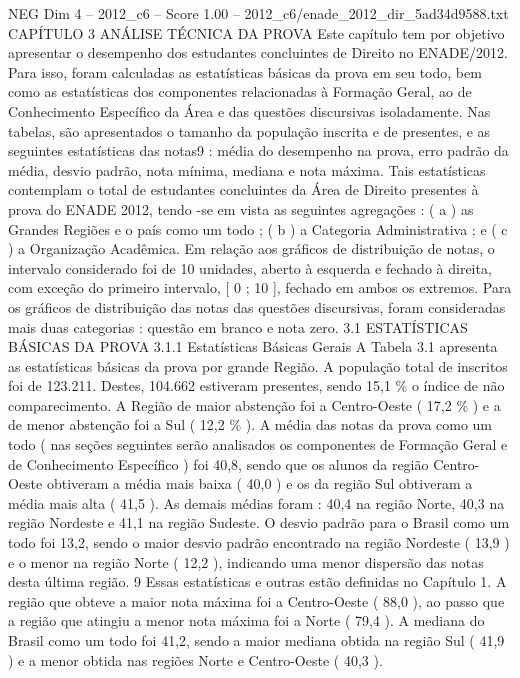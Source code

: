 \begin{textsample}{NEG Dim 4 – 2012\_c6 – Score 1.00 – 2012\_c6/enade\_2012\_dir\_5ad34d9588.txt}  \label{ex:f4_neg_234}
CAPÍTULO 3 ANÁLISE TÉCNICA DA PROVA Este capítulo tem por objetivo apresentar o desempenho dos estudantes concluintes de Direito no ENADE/2012.
Para isso, foram calculadas as estatísticas básicas da prova em seu todo, bem como as estatísticas dos componentes relacionadas à Formação Geral, ao de Conhecimento Específico da Área e das questões discursivas isoladamente.
Nas tabelas, são apresentados o tamanho da população inscrita e de presentes, e as seguintes estatísticas das notas9 : média do desempenho na prova, erro padrão da média, desvio padrão, nota mínima, mediana e nota máxima.
Tais estatísticas contemplam o total de estudantes concluintes da Área de Direito presentes à prova do ENADE 2012, tendo -se em vista as seguintes agregações : ( a ) as Grandes Regiões e o país como um todo ; ( b ) a Categoria Administrativa ; e ( c ) a Organização Acadêmica.
Em relação aos gráficos de distribuição de notas, o intervalo considerado foi de 10 unidades, aberto à esquerda e fechado à direita, com exceção do primeiro intervalo, [ 0 ; 10 ], fechado em ambos os extremos.
Para os gráficos de distribuição das notas das questões discursivas, foram consideradas mais duas categorias : questão em branco e nota zero. 3.1 ESTATÍSTICAS BÁSICAS DA PROVA 3.1.1 Estatísticas Básicas Gerais A Tabela 3.1 apresenta as estatísticas básicas da prova por grande Região.
A população total de inscritos foi de 123.211.
Destes, 104.662 estiveram presentes, sendo 15,1 \% o índice de não comparecimento.
A Região de maior abstenção foi a Centro-Oeste ( 17,2 \% ) e a de menor abstenção foi a Sul ( 12,2 \% ).
A média das notas da prova como um todo ( nas seções seguintes serão analisados os componentes de Formação Geral e de Conhecimento Específico ) foi 40,8, sendo que os alunos da região Centro-Oeste obtiveram a média mais baixa ( 40,0 ) e os da região Sul obtiveram a média mais alta ( 41,5 ).
As demais médias foram : 40,4 na região Norte, 40,3 na região Nordeste e 41,1 na região Sudeste.
O desvio padrão para o Brasil como um todo foi 13,2, sendo o maior desvio padrão encontrado na região Nordeste ( 13,9 ) e o menor na região Norte ( 12,2 ), indicando uma menor dispersão das notas desta última região. 9 Essas estatísticas e outras estão definidas no Capítulo 1.
A região que obteve a maior nota máxima foi a Centro-Oeste ( 88,0 ), ao passo que a região que atingiu a menor nota máxima foi a Norte ( 79,4 ).
A mediana do Brasil como um todo foi 41,2, sendo a maior mediana obtida na região Sul ( 41,9 ) e a menor obtida nas regiões Norte e Centro-Oeste ( 40,3 ).

\end{textsample}
